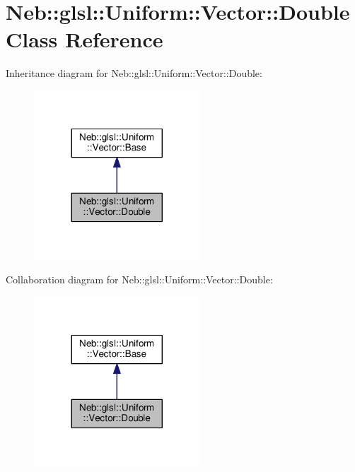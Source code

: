 \hypertarget{classNeb_1_1glsl_1_1Uniform_1_1Vector_1_1Double}{\section{Neb\-:\-:glsl\-:\-:Uniform\-:\-:Vector\-:\-:Double Class Reference}
\label{classNeb_1_1glsl_1_1Uniform_1_1Vector_1_1Double}
}


Inheritance diagram for Neb\-:\-:glsl\-:\-:Uniform\-:\-:Vector\-:\-:Double\-:
\nopagebreak
\begin{figure}[H]
\begin{center}
\leavevmode
\includegraphics[width=176pt]{classNeb_1_1glsl_1_1Uniform_1_1Vector_1_1Double__inherit__graph}
\end{center}
\end{figure}


Collaboration diagram for Neb\-:\-:glsl\-:\-:Uniform\-:\-:Vector\-:\-:Double\-:
\nopagebreak
\begin{figure}[H]
\begin{center}
\leavevmode
\includegraphics[width=176pt]{classNeb_1_1glsl_1_1Uniform_1_1Vector_1_1Double__coll__graph}
\end{center}
\end{figure}
